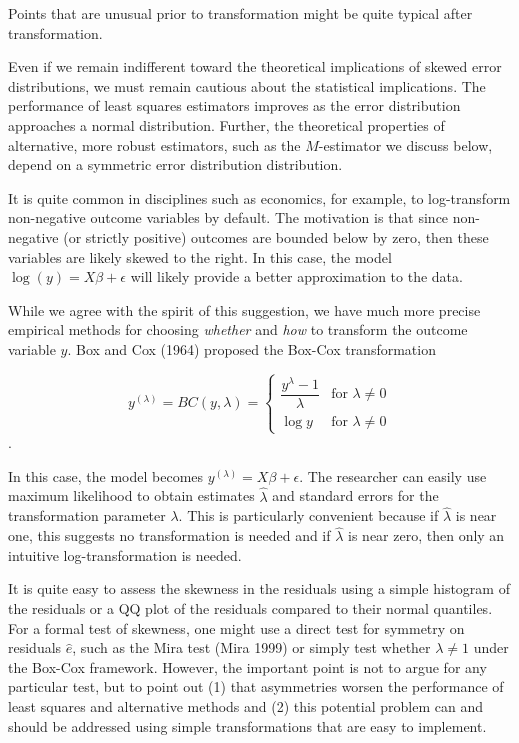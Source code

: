 \documentclass[12pt]{article}
\begin{document}
Points that are unusual prior to transformation might be quite typical after transformation.

Even if we remain indifferent toward the theoretical implications of skewed error distributions, we must remain cautious about the statistical implications. The performance of least squares estimators improves as the error distribution approaches a normal distribution. Further, the theoretical properties of alternative, more robust estimators, such as the $M$-estimator we discuss below, depend on a symmetric error distribution distribution.

It is quite common in disciplines such as economics, for example, to log-transform non-negative outcome variables by default. The motivation is that since non-negative (or strictly positive) outcomes are bounded below by zero, then these variables are likely skewed to the right. In this case, the model $\log(y) = X\beta + \epsilon$ will likely provide a better approximation to the data.

While we agree with the spirit of this suggestion, we have much more precise empirical methods for choosing \textit{whether} and \textit{how} to transform the outcome variable $y$. Box and Cox (1964) proposed the Box-Cox transformation 

\begin{displaymath}
   y^{(\lambda)} = BC(y, \lambda) = \left\{
     \begin{array}{lr}
       \dfrac{y^\lambda - 1}{\lambda} & \text{for } \lambda \neq 0\\
       \log y & \text{for } \lambda \neq 0
     \end{array}
   \right.
\end{displaymath}.

\noindent In this case, the model becomes $y^{(\lambda)} = X\beta + \epsilon$. The researcher can easily use maximum likelihood to obtain estimates $\hat{\lambda}$ and standard errors for the transformation parameter $\lambda$. This is particularly convenient because if $\hat{\lambda}$ is near one, this suggests no transformation is needed and if $\hat{\lambda}$ is near zero, then only an intuitive log-transformation is needed.

It is quite easy to assess the skewness in the residuals using a simple histogram of the residuals or a QQ plot of the residuals compared to their normal quantiles. For a formal test of skewness, one might use a direct test for symmetry on residuals $\hat{e}$, such as the Mira test (Mira 1999) or simply test whether $\lambda \neq 1$ under the Box-Cox framework. However, the important point is not to argue for any particular test, but to point out (1) that asymmetries worsen the performance of least squares and alternative methods and (2) this potential problem can and should be addressed using simple transformations that are easy to implement.
\end{document}
